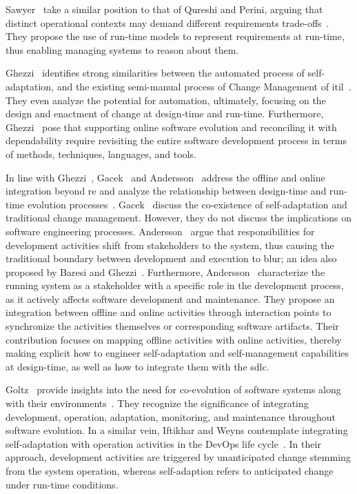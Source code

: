 Sawyer~\etal{} take a similar position to that of Qureshi and Perini, arguing that distinct operational contexts may demand different requirements trade-offs~\cite{sawyer-2010-requirements}. They propose the use of run-time models to represent requirements at run-time, thus enabling managing systems to reason about them.

Ghezzi~\etal{} identifies strong similarities between the automated process of self-adaptation, and the existing semi-manual process of Change Management of \gls{itil}~\cite{ghezzi-2008-dynamically}. They even analyze the potential for automation, ultimately, focusing on the design and enactment of change at design-time and run-time. Furthermore, Ghezzi~\etal{} pose that supporting online software evolution and reconciling it with dependability require revisiting the entire software development process in terms of methods, techniques, languages, and tools.

In line with Ghezzi~\etal{}, Gacek~\etal{} and Andersson~\etal{} address the offline and online integration beyond \gls{re} and analyze the relationship between design-time and run-time evolution processes~\cite{gacek-2008-friends,andersson-2013-software}. Gacek~\etal{} discuss the co-existence of self-adaptation and traditional change management. However, they do not discuss the implications on software engineering processes. Andersson~\etal{} argue that responsibilities for development activities shift from stakeholders to the system, thus causing the traditional boundary between development and execution to blur; an idea also proposed by Baresi and Ghezzi~\cite{baresi-2010-disappearing}. Furthermore, Andersson~\etal{} characterize the running system as a stakeholder with a specific role in the development process, as it actively affects software development and maintenance. They propose an integration between offline and online activities through interaction points to synchronize the activities themselves or corresponding software artifacts. Their contribution focuses on mapping offline activities with online activities, thereby making explicit how to engineer self-adaptation and self-management capabilities at design-time, as well as how to integrate them with the \gls{sdlc}.

Goltz~\etal{} provide insights into the need for co-evolution of software systems along with their environments~\cite{goltz-2015-design}. They recognize the significance of integrating development, operation, adaptation, monitoring, and maintenance throughout software evolution. In a similar vein, Iftikhar and Weyns contemplate integrating self-adaptation with operation activities in the DevOps life cycle~\cite{iftikhar-2017-activforms}. In their approach, development activities are triggered by unanticipated change stemming from the system operation, whereas self-adaption refers to anticipated change under run-time conditions.


